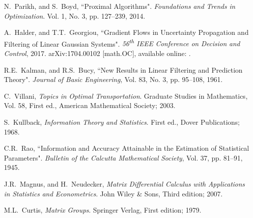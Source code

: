 \documentclass[letterpaper,10pt,twocolumn,conference]{ieeeconf}
\begin{document}
\begin{thebibliography}{99}
N.~Parikh, and S.~Boyd, ``Proximal Algorithms". \emph{Foundations and Trends in Optimization}. Vol. 1, No. 3, pp. 127--239, 2014.


A.~Halder, and T.T.~Georgiou, ``Gradient Flows in Uncertainty Propagation and Filtering of Linear Gaussian Systems". \emph{56\textsuperscript{th} IEEE Conference on Decision and Control}, 2017. arXiv:1704.00102 [math.OC], available online: .


R.E.~Kalman, and R.S.~Bucy, ``New Results in Linear Filtering and Prediction Theory". \emph{Journal of Basic Engineering}, Vol. 83, No. 3, pp. 95--108, 1961.


C.~Villani, \emph{Topics in Optimal Transportation}. Graduate Studies in Mathematics, Vol. 58, First ed., American Mathematical Society; 2003.



S.~Kullback, \emph{Information Theory and Statistics}. First ed., Dover Publications; 1968.



C.R.~Rao, ``Information and Accuracy Attainable in the Estimation of Statistical Parameters". \emph{Bulletin of the Calcutta Mathematical Society}, Vol. 37, pp. 81--91, 1945.


J.R.~Magnus, and H.~Neudecker, \emph{Matrix Differential Calculus with
Applications in Statistics and Econometrics}. John Wiley \& Sons, Third
edition; 2007.


M.L.~Curtis, \emph{Matrix Groups}. Springer Verlag, First
edition; 1979.


\end{thebibliography}
\end{document}
